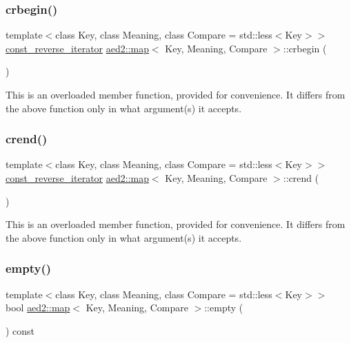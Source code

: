 \subsubsection{\texorpdfstring{crbegin()}{crbegin()}}
{\footnotesize\ttfamily template$<$class Key, class Meaning, class Compare = std\+::less$<$\+Key$>$$>$ \\
\hyperlink{classaed2_1_1map_aed66a216549d13078a3ea6978ea0b768}{const\+\_\+reverse\+\_\+iterator} \hyperlink{classaed2_1_1map}{aed2\+::map}$<$ Key, Meaning, Compare $>$\+::crbegin (\begin{DoxyParamCaption}{ }\end{DoxyParamCaption})\hspace{0.3cm}{\ttfamily [inline]}}

This is an overloaded member function, provided for convenience. It differs from the above function only in what argument(s) it accepts. \mbox{\label{classaed2_1_1map_a40933b2efe1cb479de9195ea947244d1}} 
\subsubsection{\texorpdfstring{crend()}{crend()}}
{\footnotesize\ttfamily template$<$class Key, class Meaning, class Compare = std\+::less$<$\+Key$>$$>$ \\
\hyperlink{classaed2_1_1map_aed66a216549d13078a3ea6978ea0b768}{const\+\_\+reverse\+\_\+iterator} \hyperlink{classaed2_1_1map}{aed2\+::map}$<$ Key, Meaning, Compare $>$\+::crend (\begin{DoxyParamCaption}{ }\end{DoxyParamCaption})\hspace{0.3cm}{\ttfamily [inline]}}

This is an overloaded member function, provided for convenience. It differs from the above function only in what argument(s) it accepts. \mbox{\label{classaed2_1_1map_a0dcb39283f4877ae59cb756ed1d0c048}} 
\subsubsection{\texorpdfstring{empty()}{empty()}\hspace{0.1cm}{\footnotesize\ttfamily [1/2]}}
{\footnotesize\ttfamily template$<$class Key, class Meaning, class Compare = std\+::less$<$\+Key$>$$>$ \\
bool \hyperlink{classaed2_1_1map}{aed2\+::map}$<$ Key, Meaning, Compare $>$\+::empty (\begin{DoxyParamCaption}{ }\end{DoxyParamCaption}) const\hspace{0.3cm}{\ttfamily [inline]}}



